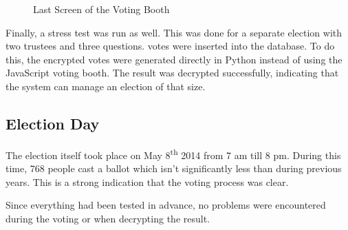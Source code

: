 \begin{figure}
  \caption{Last Screen of the Voting Booth}
  \label{fig:app:booth_submit}
\end{figure}

\par Finally, a stress test was run as well. This was done for a separate election with two trustees and three questions.  votes were inserted into the database. To do this, the encrypted votes were generated directly in Python instead of using the JavaScript voting booth. The result was decrypted successfully, indicating that the system can manage an election of that size.

\subsection{Election Day}

The election itself took place on May 8\textsuperscript{th} 2014 from 7 am till 8 pm. During this time, 768 people cast a ballot which isn't significantly less than during previous years. This is a strong indication that the voting process was clear.

\par Since everything had been tested in advance, no problems were encountered during the voting or when decrypting the result.
